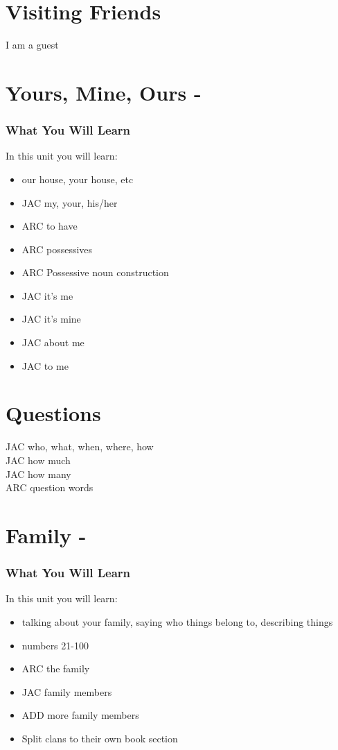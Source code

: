 \begin{multicols}
\chapter{Visiting Friends}
I am a guest\\
\index{}
\chapter{Yours, Mine, Ours - }
\subsection{What You Will Learn}
In this unit you will learn:
\begin{itemize}
\item our house, your house, etc
\item JAC my, your, his/her
\item ARC to have
\item ARC possessives
\item ARC Possessive noun construction
\item JAC it's me
\item JAC it's mine
\item JAC about me
\item JAC to me
\end{itemize}\newpage

\newpage{}
\chapter{Questions}
JAC who, what, when, where, how\\
JAC how much\\
JAC how many\\
ARC question words\\
\index{}
\chapter{Family - }
\subsection{What You Will Learn}
In this unit you will learn:
\begin{itemize}
\item talking about your family, saying who things belong to, describing things
\item numbers 21-100
\item ARC the family
\item JAC family members
\item ADD more family members
\item Split clans to their own book section
\end{itemize}\newpage


\end{multicols}
